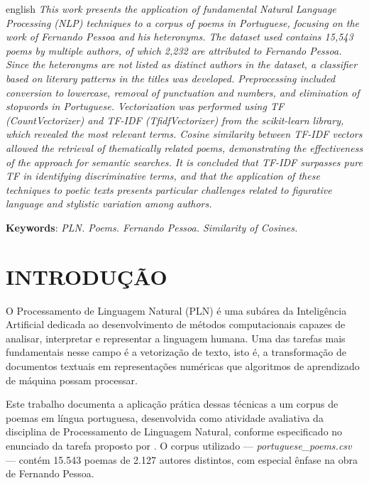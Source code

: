 \documentclass[
	article,
	12pt,
	oneside,
	a4paper,
	english,
	brazil,
	sumario=tradicional
]{abntex2}
\begin{document}
\renewcommand{\resumoname}{ABSTRACT}
\begin{resumoumacoluna}
	\begin{otherlanguage*}{english}
		\textit{This work presents the application of fundamental Natural Language Processing (NLP) techniques to a corpus of poems in Portuguese, focusing on the work of Fernando Pessoa and his heteronyms. The dataset used contains 15,543 poems by multiple authors, of which 2,232 are attributed to Fernando Pessoa. Since the heteronyms are not listed as distinct authors in the dataset, a classifier based on literary patterns in the titles was developed. Preprocessing included conversion to lowercase, removal of punctuation and numbers, and elimination of stopwords in Portuguese. Vectorization was performed using TF (CountVectorizer) and TF-IDF (TfidfVectorizer) from the scikit-learn library, which revealed the most relevant terms. Cosine similarity between TF-IDF vectors allowed the retrieval of thematically related poems, demonstrating the effectiveness of the approach for semantic searches. It is concluded that TF-IDF surpasses pure TF in identifying discriminative terms, and that the application of these techniques to poetic texts presents particular challenges related to figurative language and stylistic variation among authors.}
		\vspace{\onelineskip}

		\noindent
		\textbf{Keywords}: \textit{PLN. Poems. Fernando Pessoa. Similarity of Cosines.}
	\end{otherlanguage*}  
\end{resumoumacoluna}

\textual

\section{\textbf{INTRODUÇÃO}}

O Processamento de Linguagem Natural (PLN) é uma subárea da Inteligência Artificial dedicada ao desenvolvimento de métodos computacionais capazes de analisar, interpretar e representar a linguagem humana. Uma das tarefas mais fundamentais nesse campo é a vetorização de texto, isto é, a transformação de documentos textuais em representações numéricas que algoritmos de aprendizado de máquina possam processar.

Este trabalho documenta a aplicação prática dessas técnicas a um corpus de poemas em língua portuguesa, desenvolvida como atividade avaliativa da disciplina de Processamento de Linguagem Natural, conforme especificado no enunciado da tarefa proposto por . O corpus utilizado — \textit{portuguese\_poems.csv} — contém 15.543 poemas de 2.127 autores distintos, com especial ênfase na obra de Fernando Pessoa.
\end{document}
